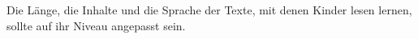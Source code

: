 Die Länge, die Inhalte und die Sprache der Texte, mit denen Kinder lesen lernen, sollte auf ihr Niveau angepasst sein.